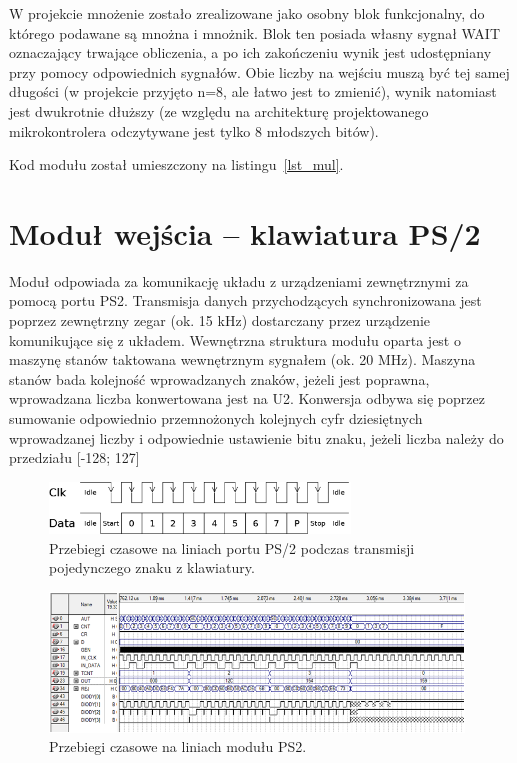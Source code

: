 \documentclass[a4paper,12pt]{report}
\begin{document}
W projekcie mnożenie zostało zrealizowane jako osobny blok funkcjonalny, do którego podawane są mnożna i mnożnik. Blok ten posiada własny sygnał WAIT oznaczający trwające obliczenia, a po ich zakończeniu wynik jest udostępniany przy pomocy odpowiednich sygnałów. Obie liczby na wejściu muszą być tej samej długości (w projekcie przyjęto n=8, ale łatwo jest to zmienić), wynik natomiast jest dwukrotnie dłuższy (ze względu na architekturę projektowanego mikrokontrolera odczytywane jest tylko 8 młodszych bitów).

Kod modułu został umieszczony na listingu~\ref{lst_mul}.

\section{Moduł wejścia -- klawiatura PS/2}

Moduł odpowiada za komunikację układu z urządzeniami zewnętrznymi za pomocą portu PS2. Transmisja danych przychodzących synchronizowana jest poprzez zewnętrzny zegar (ok. 15 kHz) dostarczany przez urządzenie komunikujące się z układem. Wewnętrzna struktura modułu oparta jest o maszynę stanów taktowana wewnętrznym sygnałem (ok. 20 MHz).  Maszyna stanów bada kolejność wprowadzanych znaków, jeżeli jest poprawna, wprowadzana liczba konwertowana jest na U2. Konwersja odbywa się poprzez sumowanie odpowiednio przemnożonych kolejnych cyfr dziesiętnych wprowadzanej liczby i odpowiednie ustawienie bitu znaku, jeżeli liczba należy do przedziału [-128; 127]

\begin{figure}[h]
\centering
\includegraphics[width=8cm]{./pict/PS2.png}
\caption{Przebiegi czasowe na liniach portu PS/2 podczas transmisji pojedynczego znaku z klawiatury.}
\label{fig:ps2}
\end{figure}

\begin{figure}[h]
\centering
\includegraphics[width=11cm]{./pict/PS2_sim.png}
\caption{Przebiegi czasowe na liniach modułu PS2.}
\label{fig:ps2_sim}
\end{figure}
\end{document}

